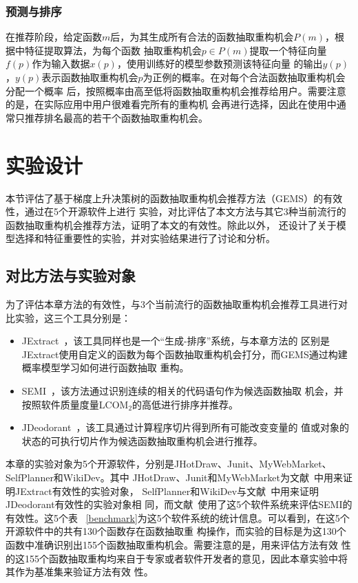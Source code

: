 \subsubsection{预测与排序}
在推荐阶段，给定函数$m$后，为其生成所有合法的函数抽取重构机会$P(m)$，根据中特征提取算法，为每个函数
抽取重构机会$p\in P(m)$提取一个特征向量$f(p)$作为输入数据$x(p)$，使用训练好的模型参数预测该特征向量
的输出$y(p)$，$y(p)$表示函数抽取重构机会$p$为正例的概率。在对每个合法函数抽取重构机会分配一个概率
后，按照概率由高至低将函数抽取重构机会推荐给用户。需要注意的是，在实际应用中用户很难看完所有的重构机
会再进行选择，因此在使用中通常只推荐排名最高的若干个函数抽取重构机会。

\section{实验设计}
本节评估了基于梯度上升决策树的函数抽取重构机会推荐方法（GEMS）的有效性，通过在5个开源软件上进行
实验，对比评估了本文方法与其它3种当前流行的函数抽取重构机会推荐方法，证明了本文的有效性。除此以外，
还设计了关于模型选择和特征重要性的实验，并对实验结果进行了讨论和分析。

\subsection{对比方法与实验对象}
为了评估本章方法的有效性，与3个当前流行的函数抽取重构机会推荐工具进行对比实验，这三个工具分别是：
\begin{itemize}
  \item JExtract~\cite{silva:ICPC14,silva:CoRR15}，该工具同样也是一个``生成-排序''系统，与本章方法的
区别是JExtract使用自定义的函数为每个函数抽取重构机会打分，而GEMS通过构建概率模型学习如何进行函数抽取
重构。
  \item SEMI~\cite{charalampidou2016identifying}，该方法通过识别连续的相关的代码语句作为候选函数抽取
机会，并按照软件质量度量LCOM$_2$的高低进行排序并推荐。
  \item JDeodorant~\cite{tsantalis2011identification}，该工具通过计算程序切片得到所有可能改变变量的
  值或对象的状态的可执行切片作为候选函数抽取重构机会进行推荐。
\end{itemize}

本章的实验对象为5个开源软件，分别是JHotDraw、Junit、MyWebMarket、SelfPlanner和WikiDev。其中
JHotDraw、Junit和MyWebMarket为文献~\cite{silva:ICPC14}中用来证明JExtract有效性的实验对象，
SelfPlanner和WikiDev与文献~\cite{tsantalis2011identification}中用来证明JDeodorant有效性的实验对象相
同，而文献~\cite{charalampidou2016identifying}使用了这5个软件系统来评估SEMI的有效性。这5个表
~\ref{benchmark}为这5个软件系统的统计信息。可以看到，在这5个开源软件中的共有130个函数存在函数抽取重
构操作，而实验的目标是为这130个函数中准确识别出155个函数抽取重构机会。需要注意的是，用来评估方法有效
性的这155个函数抽取重构均来自于专家或者软件开发者的意见，因此本章实验中将其作为基准集来验证方法有效
性。

